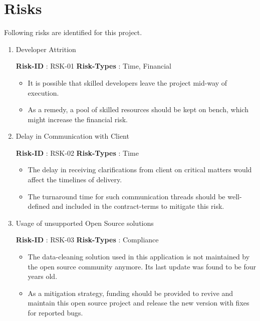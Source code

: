 \documentclass{article}%
\makeatletter
\newcommand{\tinytosmall}{%
  \fontsize
    {\fpeval{(\f@size@tiny+\f@size@small)/2}}
    {\fpeval{(\f@baselineskip@tiny+\f@baselineskip@small)/2}}%
  \selectfont
}
\makeatother
\begin{document}
\section{Risks}%

%
\par%
Following risks are identified for this project.%
\begin{enumerate}%
\item%
\hypertarget{ID:904867794}{}%
Developer Attrition%
\begin{fancybox}{\small \faChevronCircleRight \normalsize \xspace %
\tinytosmall%
\textbf{Risk{-}ID}%
: %
\xspace%
RSK{-}01%
\normalsize%
}%
\tinytosmall%
\textbf{Risk{-}Types}%
: %
\xspace%
Time, Financial%
\normalsize%
\begin{itemize}%
\item%
It is possible that skilled developers leave the project mid{-}way of execution.%
\item%
As a remedy, a pool of skilled resources should be kept on bench, which might increase the financial risk.%
\end{itemize}%
\end{fancybox}%
\item%
\hypertarget{ID:914887120}{}%
Delay in Communication with Client%
\begin{fancybox}{\small \faChevronCircleRight \normalsize \xspace %
\tinytosmall%
\textbf{Risk{-}ID}%
: %
\xspace%
RSK{-}02%
\normalsize%
}%
\tinytosmall%
\textbf{Risk{-}Types}%
: %
\xspace%
Time%
\normalsize%
\begin{itemize}%
\item%
The delay in receiving clarifications from client on critical matters would affect the timelines of delivery.%
\item%
The turnaround time for such communication threads should be well{-}defined and included in the contract{-}terms to mitigate this risk.%
\end{itemize}%
\end{fancybox}%
\item%
\hypertarget{ID:1749851212}{}%
Usage of unsupported Open Source solutions%
\begin{fancybox}{\small \faChevronCircleRight \normalsize \xspace %
\tinytosmall%
\textbf{Risk{-}ID}%
: %
\xspace%
RSK{-}03%
\normalsize%
}%
\tinytosmall%
\textbf{Risk{-}Types}%
: %
\xspace%
Compliance%
\normalsize%
\begin{itemize}%
\item%
The data{-}cleaning solution used in this application is not maintained by the open source community anymore. Its last update was found to be four years old.%
\item%
As a mitigation strategy, funding should be provided to revive and maintain this open source project and release the new version with fixes for reported bugs.%
\end{itemize}%
\end{fancybox}%
\end{enumerate}%
\hypertarget{ID:299773748}{}%
\end{document}
